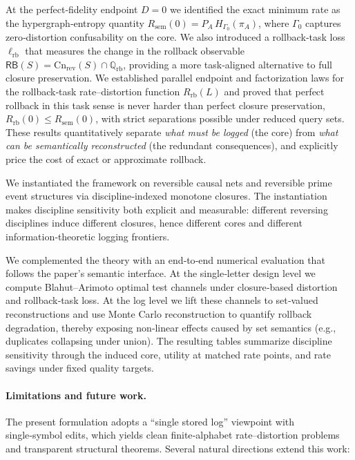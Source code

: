 \documentclass[twoside]{article}
\newcommand{\Cn}{\mathrm{Cn}}
\newcommand{\sem}{\mathrm{sem}}
\newcommand{\1}{\mathbf{1}}
\begin{document}
At the perfect‑fidelity endpoint \(D=0\) we identified the exact minimum rate as
the hypergraph‑entropy quantity
\(R_{\sem}(0)=P_A\,H_{\Gamma_0}(\pi_A)\),
where \(\Gamma_0\) captures zero‑distortion confusability on the core.
We also introduced a rollback‑task loss \(\ell_{\mathrm{rb}}\) that measures the
change in the rollback observable
\(\mathsf{RB}(S)=\Cn_{\mathrm{rev}}(S)\cap \mathbb Q_{\mathrm{rb}}\),
providing a more task‑aligned alternative to full closure preservation.
We established parallel endpoint and factorization laws for the rollback‑task
rate--distortion function \(R_{\mathrm{rb}}(L)\) and proved that perfect rollback
in this task sense is never harder than perfect closure preservation,
\(R_{\mathrm{rb}}(0)\le R_{\sem}(0)\), with strict separations possible under
reduced query sets.
These results quantitatively separate \emph{what must be logged} (the core)
from \emph{what can be semantically reconstructed} (the redundant consequences),
and explicitly price the cost of exact or approximate rollback.

We instantiated the framework on reversible causal nets and reversible prime
event structures via discipline‑indexed monotone closures.
The instantiation makes discipline sensitivity both explicit and measurable:
different reversing disciplines induce different closures, hence different cores
and different information‑theoretic logging frontiers.

We complemented the theory with an end‑to‑end numerical evaluation that follows
the paper's semantic interface.
At the single‑letter design level we compute Blahut--Arimoto optimal test
channels under closure‑based distortion and rollback‑task loss.
At the log level we lift these channels to set‑valued reconstructions and use
Monte Carlo reconstruction to quantify rollback degradation, thereby exposing
non‑linear effects caused by set semantics (e.g., duplicates collapsing under
union).
The resulting tables summarize discipline sensitivity through the induced core,
utility at matched rate points, and rate savings under fixed quality targets.

\paragraph{Limitations and future work.}
The present formulation adopts a ``single stored log'' viewpoint with single‑symbol
edits, which yields clean finite‑alphabet rate--distortion problems and transparent
structural theorems.
Several natural directions extend this work:
\end{document}
